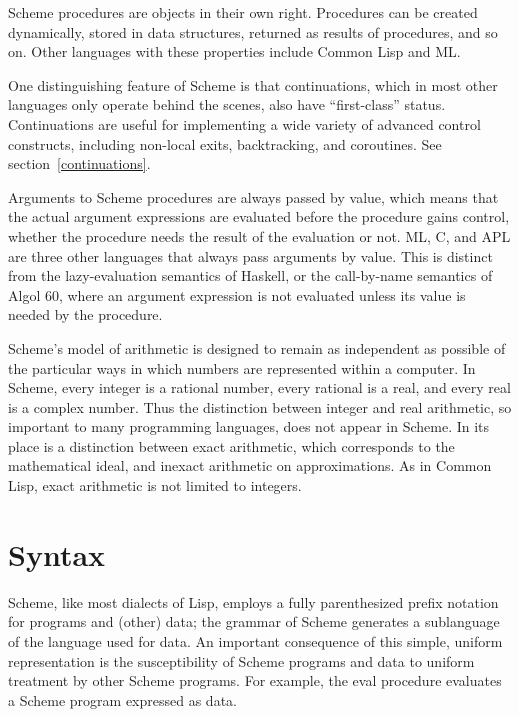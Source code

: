 \vest Scheme procedures are objects in their own right.  Procedures can be
created dynamically, stored in data structures, returned as results of
procedures, and so on.  Other languages with these properties include
Common Lisp and ML. 

\vest One distinguishing feature of Scheme is that continuations, which
in most other languages only operate behind the scenes, also have
``first-class'' status.  Continuations are useful for implementing a
wide variety of advanced control constructs, including non-local exits,
backtracking, and coroutines.  See section~\ref{continuations}.

\vest Arguments to Scheme procedures are always passed by value, which
means that the actual argument expressions are evaluated before the
procedure gains control, whether the procedure needs the result of the
evaluation or not.  ML, C, and APL are three other languages that always
pass arguments by value.
This is distinct from the lazy-evaluation semantics of Haskell,
or the call-by-name semantics of Algol 60, where an argument
expression is not evaluated unless its value is needed by the
procedure.


\vest Scheme's model of arithmetic is designed to remain as independent as
possible of the particular ways in which numbers are represented within a
computer. In Scheme, every integer is a rational number, every rational is a
real, and every real is a complex number.  Thus the distinction between integer
and real arithmetic, so important to many programming languages, does not
appear in Scheme.  In its place is a distinction between exact arithmetic,
which corresponds to the mathematical ideal, and inexact arithmetic on
approximations.  As in Common Lisp, exact arithmetic is not limited to
integers.

\section{Syntax}

Scheme, like most dialects of Lisp, employs a fully parenthesized prefix
notation for programs and (other) data; the grammar of Scheme generates a
sublanguage of the language used for data.  An important
consequence of this simple, uniform representation is the susceptibility of
Scheme programs and data to uniform treatment by other Scheme programs.
For example, the {\cf eval} procedure evaluates a Scheme program expressed
as data.

